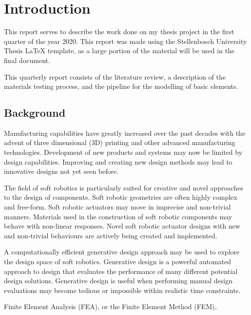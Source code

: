 \chapter{Introduction}
\label{chp:Intro}

This report serves to describe the work done on my thesis project in the first quarter of the year 2020. This report was made using the Stellenbosch University Thesis LaTeX template, as a large portion of the material will be used in the final document.

This quarterly report consists of the literature review, a description of the materials testing process, and the pipeline for the modelling of basic elements.

\section{Background}

Manufacturing capabilities have greatly increased over the past decades with the advent of three dimensional (3D) printing and other advanced manufacturing technologies. Development of new products and systems may now be limited by design capabilities. Improving and creating new design methods may lead to innovative designs not yet seen before.

The field of soft robotics is particularly suited for creative and novel approaches to the design of components. Soft robotic geometries are often highly complex and free-form. Soft robotic actuators may move in imprecise and non-trivial manners. Materials used in the construction of soft robotic components may behave with non-linear responses. Novel soft robotic actuator designs with new and non-trivial behaviours are actively being created and implemented.

A computationally efficient generative design approach may be used to explore the design space of soft robotics. Generative design is a powerful automated approach to design that evaluates the performance of many different potential design solutions. Generative design is useful when performing manual design evaluations may become tedious or impossible within realistic time constraints.

Finite Element Analysis (FEA), or the Finite Element Method (FEM), 